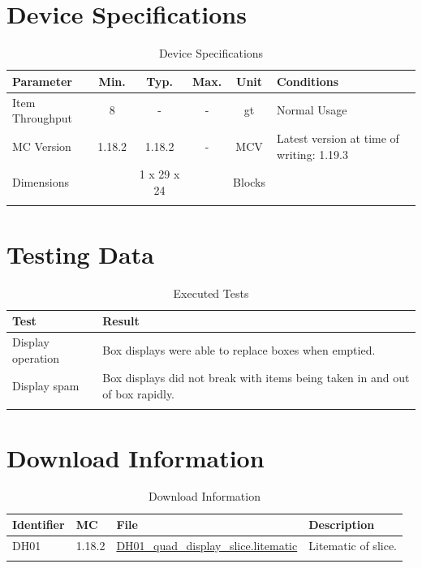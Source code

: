 \documentclass[10pt]{datasheet}
\begin{document}
\onecolumn

\section{Device Specifications}

\begin{table}[h]
    \caption{Device Specifications}
    \begin{tabularx}{\textwidth}{l | c c c | c | X}
        \thickhline
        \textbf{Parameter} & \textbf{Min.} & \textbf{Typ.} & \textbf{Max.} &
        \textbf{Unit} & \textbf{Conditions} \\
        \hline
        Item Throughput  & 8 & - & - & gt & Normal Usage \\
        \hline
        MC Version & 1.18.2 & 1.18.2 & - & MCV & Latest version at time of writing: 1.19.3\\
        \hline
        Dimensions & & 1 x 29 x 24 & & Blocks & \\
        \thickhline
\end{tabularx}
\end{table}
\newpage
\section{Testing Data}
\begin{table}[h]
\caption{Executed Tests}
\begin{tabularx}{\textwidth}{l | X}
    \thickhline
    \textbf{Test} & \textbf{Result} \\
    \hline
    Display operation & Box displays were able to replace boxes when emptied. \\
    \hline
    Display spam & Box displays did not break with items being taken in and out of box rapidly. \\
    \thickhline
\end{tabularx}
\end{table}

\section{Download Information}
\begin{table}[h]
    \caption{Download Information}
    \begin{tabularx}{\textwidth}{l | l | l | X}
        \thickhline
        \textbf{Identifier} & \textbf{MC} & \textbf{File} & \textbf{Description} \\
        \hline
        DH01 & 1.18.2 & \href{https://github.com/Soontech-Annals/Archive/blob/92d3541e07ddc3ab90360e923907f040eca76834/Archive/display-halls/DH01\%20Quad\%20Display\%20Slice\%20With\%20Reliable\%20Collection/DH01\_quad\_display\_slice.litematic?raw=1}{DH01\_quad\_display\_slice.litematic} & Litematic of slice. \\
        \hline
        \thickhline
    \end{tabularx}
\end{table}
\end{document}

